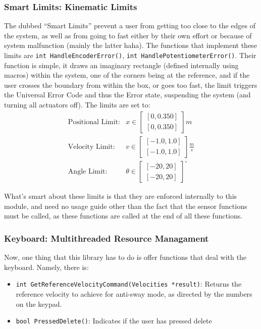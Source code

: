 \documentclass[letterpaper]{article}
\begin{document}
\subsubsection{Smart Limits: Kinematic Limits}
The dubbed ``Smart Limits'' prevent a user from getting too close to the edges of the system, as well as from going to fast either by their own effort or because of system malfunction (mainly the latter haha). The functions that implement these limits are \texttt{int HandleEncoderError()}, \texttt{int HandlePotentiometerError()}. Their function is simple, it draws an imaginary rectangle (defined internally using macros) within the system, one of the corners being at the reference, and if the user crosses the boundary from within the box, or goes too fast, the limit triggers the Universal Error Code and thus the Error state, suspending the system (and turning all actuators off). The limits are set to:
$$\boxed{
    \begin{matrix}
        \text{Positional Limit:} & x \in \begin{bmatrix}
            [0, 0.350] \\
            [0, 0.350]
        \end{bmatrix} m \\
        \text{Velocity Limit:} & v \in \begin{bmatrix}
            [-1.0, 1.0] \\
            [-1.0, 1.0]
        \end{bmatrix} \frac{m}{s} \\
        \text{Angle Limit:} & \theta \in \begin{bmatrix}
            [-20, 20] \\
            [-20, 20]
        \end{bmatrix}^\circ 
    \end{matrix}
}$$

What's smart about these limits is that they are enforced internally to this module, and need no usage guide other than the fact that the sensor functions must be called, as these functions are called at the end of all these functions.
\subsubsection{Keyboard: Multithreaded Resource Managament}

Now, one thing that this library has to do is offer functions that deal with the keyboard. Namely, there is:
\begin{itemize}
    \item \texttt{int GetReferenceVelocityCommand(Velocities *result)}: Returns the reference velocity to achieve for anti-sway mode, as directed by the numbers on the keypad.
    \item \texttt{bool PressedDelete()}: Indicates if the user has pressed delete
\end{itemize}
\end{document}
